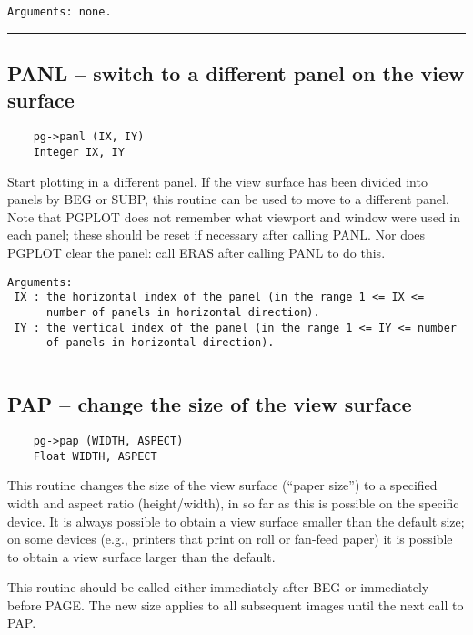 \begin{verbatim}
Arguments: none.
\end{verbatim}

\hrule

\subsection*{PANL -- switch to a different panel on the view surface }

\begin{verbatim}
    pg->panl (IX, IY)
    Integer IX, IY
\end{verbatim}

Start plotting in a different panel.  If the view surface has been
divided into panels by BEG or SUBP, this routine can be used to move
to a different panel.  Note that PGPLOT does not remember what
viewport and window were used in each panel; these should be reset
if necessary after calling PANL.  Nor does PGPLOT clear the panel:
call ERAS after calling PANL to do this.

\begin{verbatim}
Arguments:
 IX : the horizontal index of the panel (in the range 1 <= IX <=
      number of panels in horizontal direction).
 IY : the vertical index of the panel (in the range 1 <= IY <= number
      of panels in horizontal direction).
\end{verbatim}

\hrule

\subsection*{PAP -- change the size of the view surface  }

\begin{verbatim}
    pg->pap (WIDTH, ASPECT)
    Float WIDTH, ASPECT
\end{verbatim}

This routine changes the size of the view surface (``paper size'') to
a specified width and aspect ratio (height/width), in so far as this
is possible on the specific device.  It is always possible to obtain a
view surface smaller than the default size; on some devices (e.g.,
printers that print on roll or fan-feed paper) it is possible to
obtain a view surface larger than the default.

This routine should be called either immediately after BEG or
immediately before PAGE.  The new size applies to all subsequent
images until the next call to PAP.

